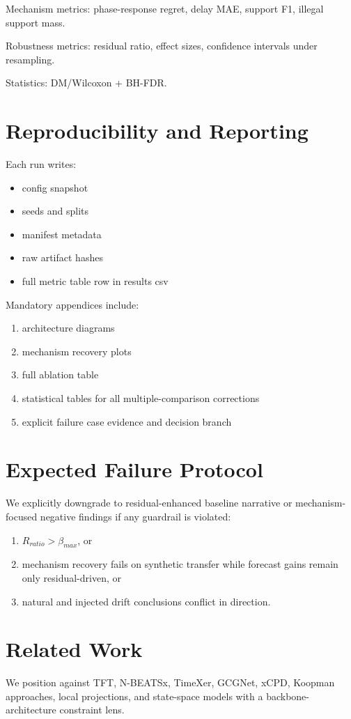 \documentclass[11pt]{article}
\begin{document}
Mechanism metrics: phase-response regret, delay MAE, support F1, illegal support mass.

Robustness metrics: residual ratio, effect sizes, confidence intervals under resampling.

Statistics: DM/Wilcoxon + BH-FDR.

\section{Reproducibility and Reporting}
Each run writes:
\begin{itemize}
\item config snapshot
\item seeds and splits
\item manifest metadata
\item raw artifact hashes
\item full metric table row in results csv
\end{itemize}

Mandatory appendices include:
\begin{enumerate}
\item architecture diagrams
\item mechanism recovery plots
\item full ablation table
\item statistical tables for all multiple-comparison corrections
\item explicit failure case evidence and decision branch
\end{enumerate}

\section{Expected Failure Protocol}
We explicitly downgrade to residual-enhanced baseline narrative or mechanism-focused negative findings if any guardrail is violated:
\begin{enumerate}
\item $R_{ratio} > \beta_{max}$, or
\item mechanism recovery fails on synthetic transfer while forecast gains remain only residual-driven, or
\item natural and injected drift conclusions conflict in direction.
\end{enumerate}

\section{Related Work}
We position against TFT, N-BEATSx, TimeXer, GCGNet, xCPD, Koopman approaches, local projections, and state-space models with a backbone-architecture constraint lens.
\end{document}
